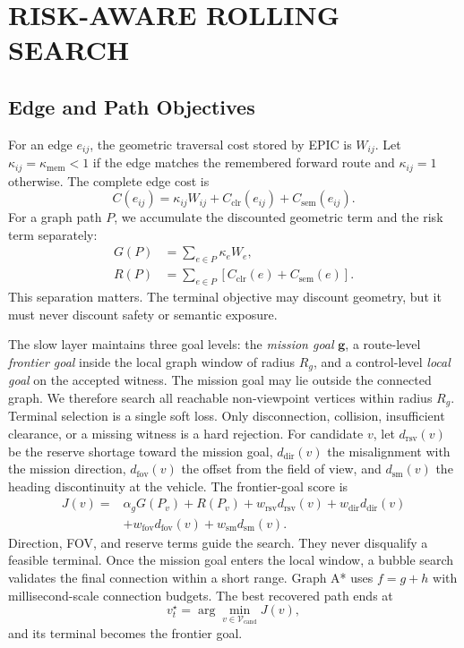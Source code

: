 \documentclass[letterpaper,10pt,conference]{ieeeconf}
\newcommand{\vect}[1]{\boldsymbol{#1}}
\begin{document}
\section{RISK-AWARE ROLLING SEARCH}
\subsection{Edge and Path Objectives}
For an edge $e_{ij}$, the geometric traversal cost stored by EPIC is
$W_{ij}$.
Let $\kappa_{ij}=\kappa_{\mathrm{mem}}<1$ if the edge matches the remembered
forward route and $\kappa_{ij}=1$ otherwise.
The complete edge cost is
\begin{equation}
 C(e_{ij})=\kappa_{ij}W_{ij}
          +C_{\mathrm{clr}}(e_{ij})+C_{\mathrm{sem}}(e_{ij}).
\label{eq:edge_cost}
\end{equation}
For a graph path $P$, we accumulate the discounted geometric term and the
risk term separately:
\begin{align}
 G(P)&=\sum_{e\in P}\kappa_eW_e,\\
 R(P)&=\sum_{e\in P}
       \left[C_{\mathrm{clr}}(e)+C_{\mathrm{sem}}(e)\right].
\end{align}
This separation matters. The terminal objective may discount geometry, but
it must never discount safety or semantic exposure.

The slow layer maintains three goal levels: the \emph{mission goal}
$\vect{g}$, a route-level \emph{frontier goal} inside the local graph window
of radius $R_g$, and a control-level \emph{local goal} on the accepted
witness.
The mission goal may lie outside the connected graph. We therefore search
all reachable non-viewpoint vertices within radius $R_g$.
Terminal selection is a single soft loss. Only disconnection, collision,
insufficient clearance, or a missing witness is a hard rejection.
For candidate $v$, let $d_{\mathrm{rsv}}(v)$ be the reserve shortage toward
the mission goal, $d_{\mathrm{dir}}(v)$ the misalignment with the mission
direction, $d_{\mathrm{fov}}(v)$ the offset from the field of view, and
$d_{\mathrm{sm}}(v)$ the heading discontinuity at the vehicle.
The frontier-goal score is
\begin{align}
 J(v)={}&\alpha_gG(P_v)+R(P_v)
       +w_{\mathrm{rsv}}d_{\mathrm{rsv}}(v)+w_{\mathrm{dir}}d_{\mathrm{dir}}(v)
       \nonumber\\
       &+w_{\mathrm{fov}}d_{\mathrm{fov}}(v)
       +w_{\mathrm{sm}}d_{\mathrm{sm}}(v).
\label{eq:terminal}
\end{align}
Direction, FOV, and reserve terms guide the search. They never disqualify a
feasible terminal. Once the mission goal enters the local window, a bubble
search validates the final connection within a short range.
Graph A* uses $f=g+h$ with millisecond-scale connection budgets.
The best recovered path ends at
\begin{equation}
 v_t^\star=\arg\min_{v\in\mathcal{V}_{\mathrm{cand}}}J(v),
\end{equation}
and its terminal becomes the frontier goal.
\end{document}
